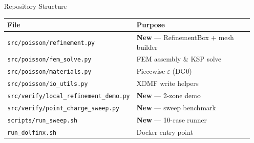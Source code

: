 \documentclass[aspectratio=169]{beamer}
\begin{document}
\begin{frame}{Repository Structure}
  \begin{center}
  \footnotesize
  \begin{tabular}{ll}
    \toprule
    File & Purpose \\
    \midrule
    \texttt{src/poisson/refinement.py}           & \textbf{New} — RefinementBox + mesh builder \\
    \texttt{src/poisson/fem\_solve.py}            & FEM assembly \& KSP solve \\
    \texttt{src/poisson/materials.py}             & Piecewise $\varepsilon$ (DG0) \\
    \texttt{src/poisson/io\_utils.py}             & XDMF write helpers \\
    \texttt{src/verify/local\_refinement\_demo.py}& \textbf{New} — 2-zone demo \\
    \texttt{src/verify/point\_charge\_sweep.py}   & \textbf{New} — sweep benchmark \\
    \texttt{scripts/run\_sweep.sh}                & \textbf{New} — 10-case runner \\
    \texttt{run\_dolfinx.sh}                      & Docker entry-point \\
    \bottomrule
  \end{tabular}
  \end{center}
\end{frame}
\end{document}
